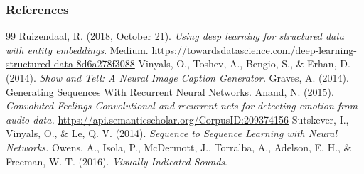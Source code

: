 \documentclass[11pt,compress,t,notes=noshow, xcolor=table]{beamer}
\begin{document}
\begin{vbframe}
\frametitle{References}
\footnotesize{
\begin{thebibliography}{99}
Ruizendaal, R. (2018, October 21). \textit{Using deep learning for structured data with entity embeddings}. Medium. \url{https://towardsdatascience.com/deep-learning-structured-data-8d6a278f3088}
 Vinyals, O., Toshev, A., Bengio, S., \& Erhan, D. (2014). \textit{Show and Tell: A Neural Image Caption Generator.}
 Graves, A. (2014). Generating Sequences With Recurrent Neural Networks. 
 Anand, N. (2015). \textit{Convoluted Feelings Convolutional and recurrent nets for detecting emotion from audio data.} \url{https://api.semanticscholar.org/CorpusID:209374156}
Sutskever, I., Vinyals, O., \& Le, Q. V. (2014). \textit{Sequence to Sequence Learning with Neural Networks.}
Owens, A., Isola, P., McDermott, J., Torralba, A., Adelson, E. H., \& Freeman, W. T. (2016). \textit{Visually Indicated Sounds}.




\end{thebibliography}}
\end{vbframe}
\end{document}
